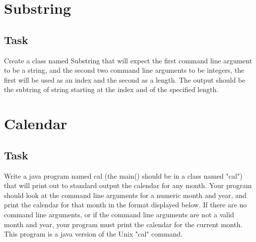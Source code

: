 \documentclass{article}
\begin{document}
\section{Substring}
\label{sec:sub}

\subsection{Task}
\label{sec:sub:task}

Create a class named Substring that will expect the first command line argument to be a string,
and the second two command line arguments to be integers, the first will be used as an index and the second as a length.
The output should be the subtring of string starting at the index and of the specified length.







\section{Calendar}
\label{sec:cal}

\subsection{Task}
\label{sec:cal:task}

Write a java program named cal (the main() should be in a class named "cal") that will print out to standard output the calendar for any month.
Your program should look at the command line arguments for a numeric month and year,
and print the calendar for that month in the format displayed below. If there are no command line arguments,
or if the command line arguments are not a valid month and year, your program must print the calendar for the current month.
This program is a java version of the Unix "cal" command.
\end{document}
